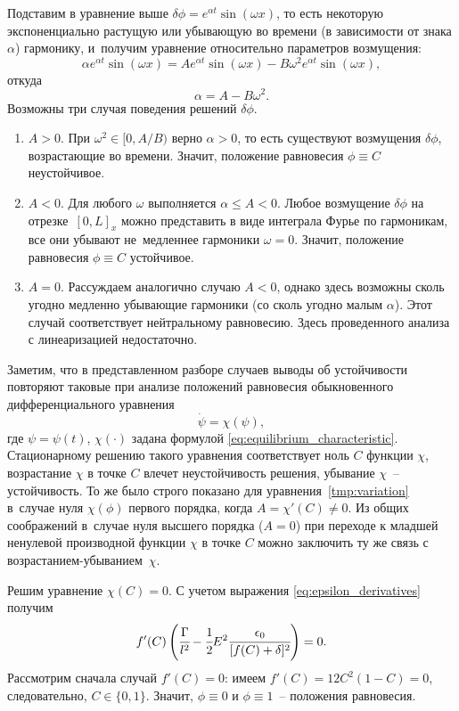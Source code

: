 Подставим в уравнение выше $\delta \phi = e^{\alpha t} \sin(\omega x)$, то есть некоторую экспоненциально растущую или убывающую во времени (в зависимости от знака $\alpha$) гармонику, и~получим уравнение относительно параметров возмущения:
\[
    \alpha e^{\alpha t} \sin(\omega x) = A e^{\alpha t} \sin(\omega x) - B \omega^2 e^{\alpha t} \sin(\omega x),
\]
откуда
\[
    \alpha = A - B \omega^2.
\]
Возможны три случая поведения решений $\delta \phi$.
\begin{enumerate}[label=\arabic*.]
    \item $A > 0$. При $\omega^2 \in [0, A / B)$ верно $\alpha > 0$, то есть существуют возмущения $\delta \phi$, возрастающие во времени. Значит, положение равновесия $\phi \equiv C$ неустойчивое.
    \item $A < 0$. Для любого $\omega$ выполняется $\alpha \leqslant A < 0$. Любое возмущение $\delta \phi$ на отрезке~$[0, L]_x$ можно представить в виде интеграла Фурье по гармоникам, все они убывают не~медленнее гармоники $\omega = 0$. Значит, положение равновесия $\phi \equiv C$ устойчивое.
    \item $A = 0$. Рассуждаем аналогично случаю $A < 0$, однако здесь возможны сколь угодно медленно убывающие гармоники (со сколь угодно малым $\alpha$). Этот случай соответствует нейтральному равновесию. Здесь проведенного анализа с линеаризацией недостаточно.
\end{enumerate}

Заметим, что в представленном разборе случаев выводы об устойчивости повторяют таковые при анализе положений равновесия обыкновенного дифференциального уравнения
\[
    \dot{\psi} = \chi(\psi),
\]
где $\psi = \psi(t)$, $\chi(\cdot)$ задана формулой \eqref{eq:equilibrium_characteristic}. Стационарному решению такого уравнения соответствует ноль $C$ функции $\chi$, возрастание $\chi$ в точке $C$ влечет неустойчивость решения, убывание $\chi$~-- устойчивость. То же было строго показано для уравнения~\eqref{tmp:variation} в~случае нуля $\chi(\phi)$ первого порядка, когда $A = \chi'(C) \neq 0$. Из общих соображений в~случае нуля высшего порядка ($A = 0$) при переходе к младшей ненулевой производной функции $\chi$ в точке $C$ можно заключить ту же связь с возрастанием-убыванием~$\chi$.

Решим уравнение $\chi(C) = 0$. С учетом выражения \eqref{eq:epsilon_derivatives} получим
\[
    f'(C) \left( \cfrac{\Gamma}{l^2} - \cfrac{1}{2} E^2 \cfrac{\epsilon_0}{[f(C) + \delta]^2} \right) = 0.
\]
Рассмотрим сначала случай $f'(C) = 0$: имеем $f'(C) = 12C^2 (1 - C) = 0$, следовательно, $C \in \{0, 1\}$. Значит, $\phi \equiv 0$ и $\phi \equiv 1$~-- положения равновесия.

